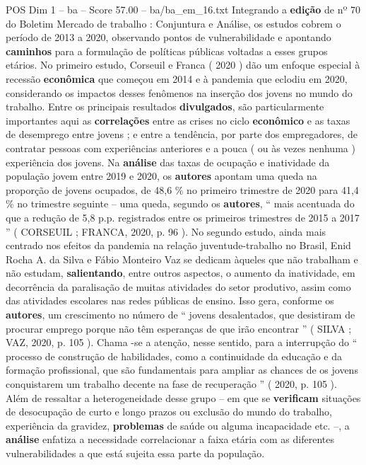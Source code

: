 \begin{textsample}{POS Dim 1 – ba – Score 57.00 – ba/ba\_em\_16.txt}
Integrando a \textbf{edição} de nº 70 do Boletim Mercado de trabalho : Conjuntura e Análise, os estudos cobrem o período de 2013 a 2020, observando pontos de vulnerabilidade e apontando \textbf{caminhos} para a formulação de políticas públicas voltadas a esses grupos etários.
No primeiro estudo, Corseuil e Franca ( 2020 ) dão um enfoque especial à recessão \textbf{econômica} que começou em 2014 e à pandemia que eclodiu em 2020, considerando os impactos desses fenômenos na inserção dos jovens no mundo do trabalho.
Entre os principais resultados \textbf{divulgados}, são particularmente importantes aqui as \textbf{correlações} entre as crises no ciclo \textbf{econômico} e as taxas de desemprego entre jovens ; e entre a tendência, por parte dos empregadores, de contratar pessoas com experiências anteriores e a pouca ( ou às vezes nenhuma ) experiência dos jovens.
Na \textbf{análise} das taxas de ocupação e inatividade da população jovem entre 2019 e 2020, os \textbf{autores} apontam uma queda na proporção de jovens ocupados, de 48,6 \% no primeiro trimestre de 2020 para 41,4 \% no trimestre seguinte – uma queda, segundo os \textbf{autores}, “ mais acentuada do que a redução de 5,8 p.p. registrados entre os primeiros trimestres de 2015 a 2017 ” ( CORSEUIL ; FRANCA, 2020, p. 96 ).
No segundo estudo, ainda mais centrado nos efeitos da pandemia na relação juventude-trabalho no Brasil, Enid Rocha A. da Silva e Fábio Monteiro Vaz se dedicam àqueles que não trabalham e não estudam, \textbf{salientando}, entre outros aspectos, o aumento da inatividade, em decorrência da paralisação de muitas atividades do setor produtivo, assim como das atividades escolares nas redes públicas de ensino.
Isso gera, conforme os \textbf{autores}, um crescimento no número de “ jovens desalentados, que desistiram de procurar emprego porque não têm esperanças de que irão encontrar ” ( SILVA ; VAZ, 2020, p. 105 ).
Chama -se a atenção, nesse sentido, para a interrupção do “ processo de construção de habilidades, como a continuidade da educação e da formação profissional, que são fundamentais para ampliar as chances de os jovens conquistarem um trabalho decente na fase de recuperação ” ( 2020, p. 105 ).
Além de ressaltar a heterogeneidade desse grupo – em que se \textbf{verificam} situações de desocupação de curto e longo prazos ou exclusão do mundo do trabalho, experiência da gravidez, \textbf{problemas} de saúde ou alguma incapacidade etc. –, a \textbf{análise} enfatiza a necessidade correlacionar a faixa etária com as diferentes vulnerabilidades a que está sujeita essa parte da população.

\end{textsample}
